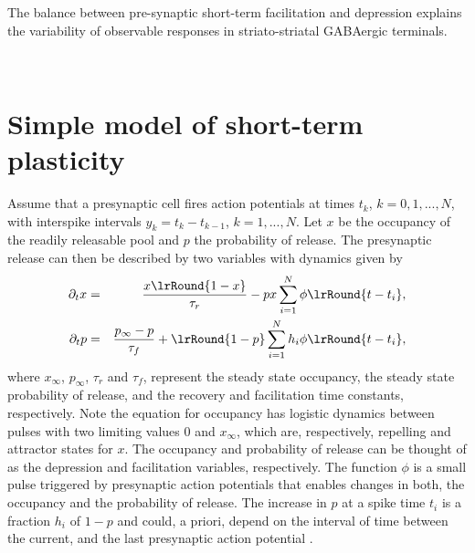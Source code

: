\documentclass[11pt,landscape]{article}
\begin{document}
\begin{flushleft}
\begin{Large}
The balance between pre-synaptic short-term facilitation and
depression explains the variability of observable responses in striato-striatal
GABAergic terminals.
\end{Large}
\\
\end{flushleft}



\section{Simple model of short-term plasticity}


Assume that a presynaptic cell fires action potentials at times $t_k$,
$k =0,1,...,N$, with interspike intervals $y_{k} = t_{k}-t_{k-1}$, $k=1,...,N$. 
Let $x$ be the occupancy of the readily releasable pool and $p$ the
probability of release. The presynaptic release
can then be described by two variables with dynamics given by
\begin{eqnarray}
\partial_t x &=& \frac{x\lrRound{1-x}}{\tau_{r}} -  p x \sum_{i=1}^{N} \phi\lrRound{t-t_i} ,
\label{eq:occupancy}
\\
\partial_t p &=&\frac{p_{\infty}-p}{\tau_{f}} + \lrRound{1-p}  \sum_{i=1}^{N}
h_i \phi \lrRound{t-t_i},
\label{eq:prelease}
\end{eqnarray}
where $x_{\infty}$, $p_{\infty}$, $\tau_{r}$ and $\tau_{f}$, represent
the steady state occupancy, the steady state probability of release,
and the recovery and facilitation time constants, respectively. Note
the equation for occupancy has logistic dynamics between pulses with
two limiting values 0 and $x_{\infty}$, which are, respectively, repelling and
attractor states for $x$.   
The
occupancy and probability of release can be thought of as the
depression and facilitation variables, respectively. The function
$\phi$ is a small pulse triggered by presynaptic action potentials
that enables changes in both, the occupancy and the probability of
release.  The increase in $p$ at a spike time $t_i$ is a fraction
$h_i$ of $1-p$ and 
could, a priori, depend on the interval of time between the current,
and the last presynaptic action
potential \citep[see][for a review]{hennig2013Theoretical}.
\end{document}
